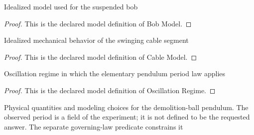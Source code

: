 \begin{definition}
  \label{def:physics:phyx-mini-0284:phyxminiproblems-problemphyxmini0284-bobmodel}
  Idealized model used for the suspended bob
\end{definition}
\begin{proof}
  This is the declared model definition of Bob Model.
\end{proof}
\begin{definition}
  \label{def:physics:phyx-mini-0284:phyxminiproblems-problemphyxmini0284-cablemodel}
  Idealized mechanical behavior of the swinging cable segment
\end{definition}
\begin{proof}
  This is the declared model definition of Cable Model.
\end{proof}
\begin{definition}
  \label{def:physics:phyx-mini-0284:phyxminiproblems-problemphyxmini0284-oscillationregime}
  Oscillation regime in which the elementary pendulum period law applies
\end{definition}
\begin{proof}
  This is the declared model definition of Oscillation Regime.
\end{proof}
\begin{definition}
  \label{def:physics:phyx-mini-0284:phyxminiproblems-problemphyxmini0284-demolitionballpendulumsetup}
  Physical quantities and modeling choices for the demolition-ball pendulum. The observed period is a field of the experiment; it is not defined to be the requested answer. The separate governing-law predicate constrains it
\end{definition}
